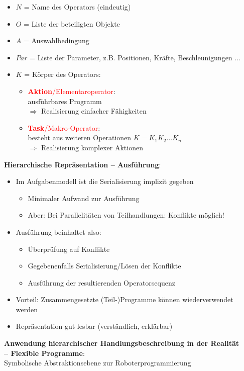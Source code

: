 \begin{itemize}
\item $N$ = Name des Operators (eindeutig)
\item $O$ = Liste der beteiligten Objekte
\item $A$ = Auswahlbedingung
\item $Par$ = Liste der Parameter, z.B. Positionen, Kräfte, Beschleunigungen ...
\item $K$ = Körper des Operators:
\begin{itemize}
\item \textcolor{red}{\textbf{Aktion}/Elementaroperator}:\\ ausführbares Programm\\ $\Rightarrow$ Realisierung einfacher Fähigkeiten
\item \textcolor{red}{\textbf{Task}/Makro-Operator}:\\ besteht aus weiteren Operationen $K = K_1K_2...K_n$\\ $\Rightarrow$ Realisierung komplexer Aktionen
\end{itemize}
\end{itemize}
\textbf{Hierarchische Repräsentation -- Ausführung}:
\begin{itemize}
\item Im Aufgabenmodell ist die Serialisierung implizit gegeben
\begin{itemize}
\item Minimaler Aufwand zur Ausführung
\item Aber: Bei Parallelitäten von Teilhandlungen: Konflikte möglich!
\end{itemize}
\item Ausführung beinhaltet also:
\begin{itemize}
\item Überprüfung auf Konflikte
\item Gegebenenfalls Serialisierung/Lösen der Konflikte
\item Ausführung der resultierenden Operatorsequenz
\end{itemize}
\item Vorteil: Zusammengesetzte (Teil-)Programme können wiederverwendet werden
\item Repräsentation gut \glqq lesbar\grqq{} (verständlich, erklärbar)
\end{itemize}
\textbf{Anwendung hierarchischer Handlungsbeschreibung in der Realität  \\-- Flexible Programme}:\\
Symbolische Abstraktionsebene zur Roboterprogrammierung
